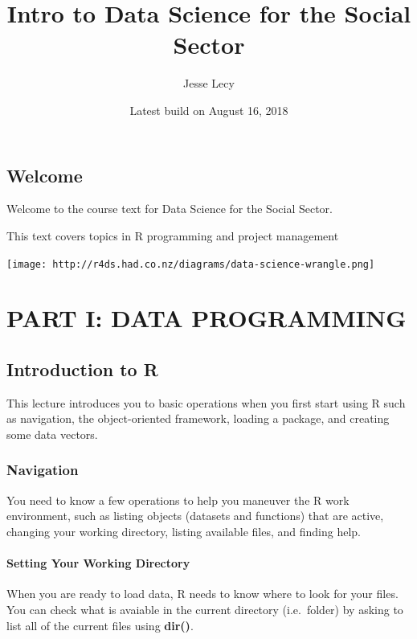 \documentclass[]{book}
\title{Intro to Data Science for the Social Sector}
\author{Jesse Lecy}
\date{Latest build on August 16, 2018}
\theoremstyle{definition}
\theoremstyle{definition}
\theoremstyle{definition}
\theoremstyle{remark}
\begin{document}
\maketitle

{
\setcounter{tocdepth}{1}
\tableofcontents
}
\hypertarget{welcome}{%
\chapter*{Welcome}\label{welcome}}

Welcome to the course text for Data Science for the Social Sector.

This text covers topics in R programming and project management

\texttt{[image: http://r4ds.had.co.nz/diagrams/data-science-wrangle.png]}

\hypertarget{part-part-i-data-programming}{%
\part{PART I: DATA
PROGRAMMING}\label{part-part-i-data-programming}}

\hypertarget{introduction-to-r}{%
\chapter{Introduction to R}\label{introduction-to-r}}

This lecture introduces you to basic operations when you first start
using R such as navigation, the object-oriented framework, loading a
package, and creating some data vectors.

\hypertarget{navigation}{%
\section{Navigation}\label{navigation}}

You need to know a few operations to help you maneuver the R work
environment, such as listing objects (datasets and functions) that are
active, changing your working directory, listing available files, and
finding help.

\hypertarget{setting-your-working-directory}{%
\subsection{Setting Your Working
Directory}\label{setting-your-working-directory}}

When you are ready to load data, R needs to know where to look for your
files. You can check what is avaiable in the current directory
(i.e.~folder) by asking to list all of the current files using
\textbf{dir()}.
\end{document}
